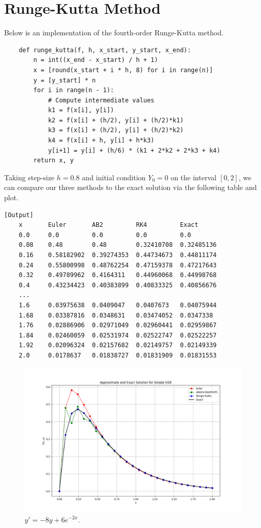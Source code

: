 \documentclass{article}
\begin{document}
\section{Runge-Kutta Method}

Below is an implementation of the fourth-order Runge-Kutta method.

\begin{verbatim}
    def runge_kutta(f, h, x_start, y_start, x_end):
        n = int((x_end - x_start) / h + 1)
        x = [round(x_start + i * h, 8) for i in range(n)]
        y = [y_start] * n
        for i in range(n - 1):
            # Compute intermediate values
            k1 = f(x[i], y[i])
            k2 = f(x[i] + (h/2), y[i] + (h/2)*k1)
            k3 = f(x[i] + (h/2), y[i] + (h/2)*k2)
            k4 = f(x[i] + h, y[i] + h*k3)
            y[i+1] = y[i] + (h/6) * (k1 + 2*k2 + 2*k3 + k4)
        return x, y
\end{verbatim}

Taking step-size \(h = 0.8\) and initial condition \(Y_0 = 0\) on the interval \([0,2]\), we can compare our three methods to the exact solution via the following table and plot.

\begin{verbatim}[Output]
    x       Euler       AB2         RK4         Exact
    0.0     0.0         0.0         0.0         0.0
    0.08    0.48        0.48        0.32410708  0.32485136
    0.16    0.58182902  0.39274353  0.44734673  0.44811174
    0.24    0.55800998  0.48762254  0.47159378  0.47217643
    0.32    0.49789962  0.4164311   0.44960068  0.44998768
    0.4     0.43234423  0.40383899  0.40833325  0.40856676
    ...
    1.6     0.03975638  0.0409047   0.0407673   0.04075944
    1.68    0.03387816  0.0348631   0.03474052  0.0347338
    1.76    0.02886906  0.02971049  0.02960441  0.02959867
    1.84    0.02460059  0.02531974  0.02522747  0.02522257
    1.92    0.02096324  0.02157682  0.02149757  0.02149339
    2.0     0.0178637   0.01838727  0.01831909  0.01831553
\end{verbatim}

\begin{figure}
    \centering
    \includegraphics[width=1.0\linewidth]{images/ODE_comparison.png}
    \caption{\(y' = -8y+6e^{-2x}\).}
\end{figure}
\end{document}
